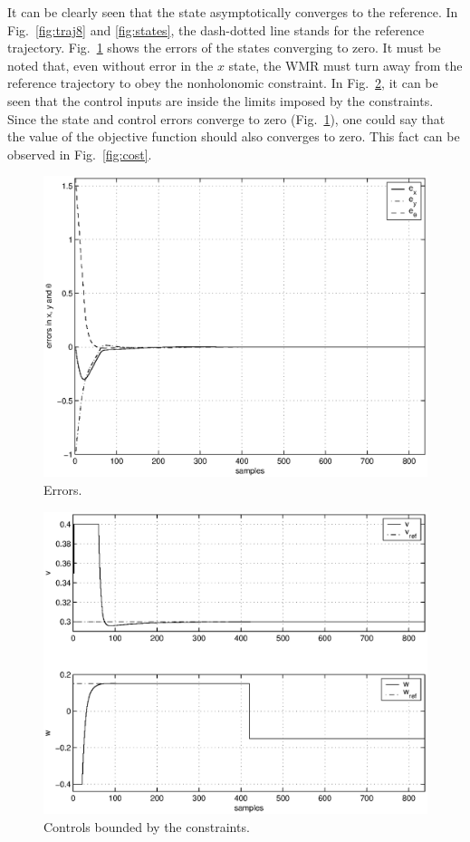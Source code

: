 \documentclass[conference]{IEEEtran} %
\begin{document}
It can be clearly seen that the state asymptotically converges to the
reference. In Fig.~\ref{fig:traj8} and \ref{fig:states}, the dash-dotted
line stands for the reference trajectory.
Fig.~\ref{fig:errors} shows the errors of the states converging to zero. It
must be noted that, even without error in the $x$ state, the WMR must turn
away from the reference trajectory to obey the nonholonomic constraint. In
Fig.~\ref{fig:controls}, it can be seen that the control inputs are inside
the limits imposed by the constraints. Since the state and control errors
converge to zero (Fig.~\ref{fig:errors}), one could say that the value of
the objective function should also converges to zero. This fact can be observed in
Fig.~\ref{fig:cost}.

\begin{figure}[htbp]
	\centering
    \includegraphics[width=.99\linewidth]{Figures/errors.eps}
    \caption{Errors.}
    \label{fig:errors}
\end{figure}

\begin{figure}[htbp]
	\centering
    \includegraphics[width=.99\linewidth]{Figures/controls.eps}
    \caption{Controls bounded by the constraints.}
    \label{fig:controls}
\end{figure}
\end{document}
